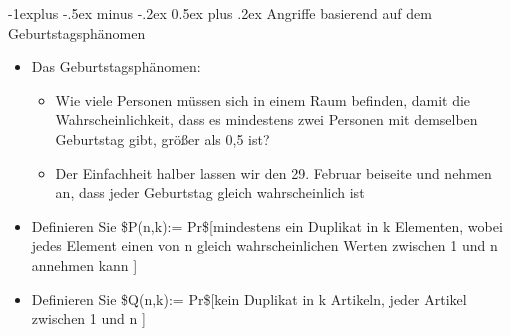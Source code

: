\documentclass[a4paper]{article}
\makeatletter
\renewcommand{\subsection}{\@startsection{subsection}{2}{0mm}%
 {-1explus -.5ex minus -.2ex}%
 {0.5ex plus .2ex}%
 {\normalfont\normalsize\bfseries}}
\makeatother
\begin{document}
\begin{multicols}{3}
    \subsection{Angriffe basierend auf dem
        Geburtstagsphänomen}

    \begin{itemize}
        \item
              Das Geburtstagsphänomen:

              \begin{itemize}
                  \item
                        Wie viele Personen müssen sich in einem Raum befinden, damit die
                        Wahrscheinlichkeit, dass es mindestens zwei Personen mit demselben
                        Geburtstag gibt, größer als 0,5 ist?
                  \item
                        Der Einfachheit halber lassen wir den 29. Februar beiseite und
                        nehmen an, dass jeder Geburtstag gleich wahrscheinlich ist
              \end{itemize}
        \item
              Definieren Sie \$P(n,k):= Pr\${[}mindestens ein Duplikat in k
              Elementen, wobei jedes Element einen von n gleich wahrscheinlichen
              Werten zwischen 1 und n annehmen kann {]}
        \item
              Definieren Sie \$Q(n,k):= Pr\${[}kein Duplikat in k Artikeln, jeder
              Artikel zwischen 1 und n {]}


\end{itemize}
\end{multicols}
\end{document}
